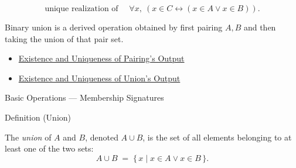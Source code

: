 \begin{remark*}
\[
  \text{unique realization of }\quad
  \forall x,\ (x\in C\leftrightarrow(x\in A\vee x\in B)).
\]
\end{remark*}

\begin{remark*}[Interpretation]
Binary union is a derived operation obtained by first pairing \(A,B\) and then
taking the union of that pair set.
\end{remark*}

\begin{dependencies}
\begin{itemize}
  \item \hyperref[thm:pairing-output-exists-unique]{Existence and Uniqueness of Pairing's Output}
  \item \hyperref[thm:union-output-exists-unique]{Existence and Uniqueness of Union's Output}
\end{itemize}
\end{dependencies}

\begin{lratopiccard}{Basic Operations --- Membership Signatures}
\begin{lrasignaturetable}
\end{lrasignaturetable}
\end{lratopiccard}

\begin{definitionbox}{Definition (Union)}
\begin{definition}[Union]\label{def:union}
The \emph{union} of $A$ and $B$, denoted $A \cup B$, is the set of all
elements belonging to at least one of the two sets:
\[
A \cup B \;=\; \{\, x \mid x \in A \lor x \in B \,\}.
\]
\end{definition}
\end{definitionbox}

